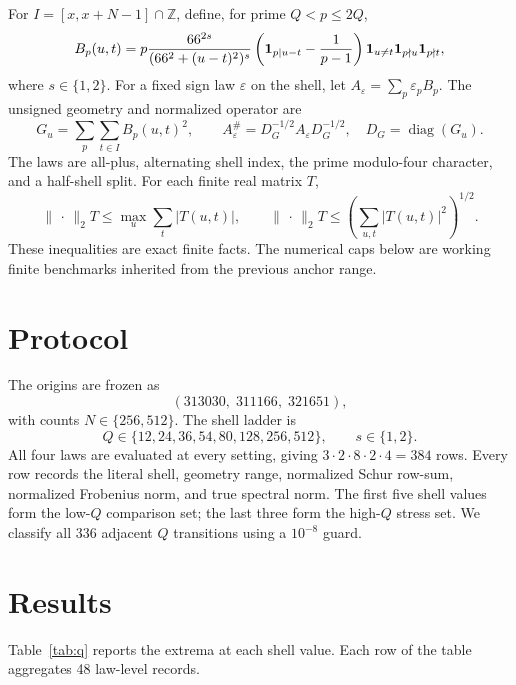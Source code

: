 \documentclass[10pt]{article}
\newcommand{\opnorm}{\lVert\,\cdot\,\rVert_2}
\begin{document}
For $I=[x,x+N-1]\cap\mathbb Z$, define, for prime $Q<p\leq2Q$,
\begin{equation}
 B_p(u,t)=p\frac{66^{2s}}{(66^2+(u-t)^2)^s}
 \left({\bf1}_{p\mid u-t}-\frac1{p-1}\right)
 {\bf1}_{u\ne t}{\bf1}_{p\nmid u}{\bf1}_{p\nmid t},
 \label{eq:block}
\end{equation}
where $s\in\{1,2\}$.  For a fixed sign law $\varepsilon$ on the shell, let
$A_\varepsilon=\sum_p\varepsilon_pB_p$.  The unsigned geometry and normalized
operator are
\begin{equation}
 G_u=\sum_p\sum_{t\in I}B_p(u,t)^2,
 \qquad A_\varepsilon^\#=D_G^{-1/2}A_\varepsilon D_G^{-1/2},
 \quad D_G=\operatorname{diag}(G_u).
 \label{eq:norm}
\end{equation}
The laws are all-plus, alternating shell index, the prime modulo-four
character, and a half-shell split.  For each finite real matrix $T$,
\begin{equation}
 \opnorm{T}\leq\max_u\sum_t|T(u,t)|,
 \qquad
 \opnorm{T}\leq\left(\sum_{u,t}|T(u,t)|^2\right)^{1/2}.
 \label{eq:envelope}
\end{equation}
These inequalities are exact finite facts.  The numerical caps below are
working finite benchmarks inherited from the previous anchor range.

\section{Protocol}

The origins are frozen as
\[
 (313030,\;311166,\;321651),
\]
with counts $N\in\{256,512\}$.  The shell ladder is
\[
 Q\in\{12,24,36,54,80,128,256,512\},
 \qquad s\in\{1,2\}.
\]
All four laws are evaluated at every setting, giving
$3\cdot2\cdot8\cdot2\cdot4=384$ rows.  Every row records the literal shell,
geometry range, normalized Schur row-sum, normalized Frobenius norm, and true
spectral norm.  The first five shell values form the low-$Q$ comparison set;
the last three form the high-$Q$ stress set.  We classify all 336 adjacent
$Q$ transitions using a $10^{-8}$ guard.

\section{Results}

Table~\ref{tab:q} reports the extrema at each shell value.  Each row of the
table aggregates 48 law-level records.
\end{document}
